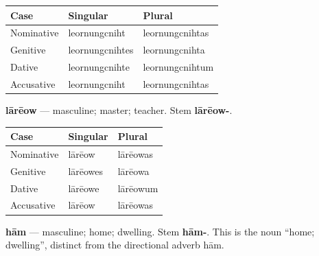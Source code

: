 \par\begingroup
\fontsize{10.5}{13.2}\selectfont
\setlength{\LTleft}{0pt}\setlength{\LTright}{\fill}
\noindent
\begin{tabular}{@{}>{\raggedright\arraybackslash}p{29.59mm}>{\raggedright\arraybackslash}p{44.39mm}>{\raggedright\arraybackslash}p{44.39mm}@{}}
\toprule
\textbf{Case} & \textbf{Singular} & \textbf{Plural} \\
\midrule
Nominative & leornungcniht & leornungcnihtas \\
Genitive & leornungcnihtes & leornungcnihta \\
Dative & leornungcnihte & leornungcnihtum \\
Accusative & leornungcniht & leornungcnihtas \\
\bottomrule
\end{tabular}
\par\endgroup

\textbf{lārēow} — masculine; master; teacher. Stem \textbf{lārēow-}.

\par\begingroup
\fontsize{10.5}{13.2}\selectfont
\setlength{\LTleft}{0pt}\setlength{\LTright}{\fill}
\noindent
\begin{tabular}{@{}>{\raggedright\arraybackslash}p{39.46mm}>{\raggedright\arraybackslash}p{39.46mm}>{\raggedright\arraybackslash}p{39.46mm}@{}}
\toprule
\textbf{Case} & \textbf{Singular} & \textbf{Plural} \\
\midrule
Nominative & lārēow & lārēowas \\
Genitive & lārēowes & lārēowa \\
Dative & lārēowe & lārēowum \\
Accusative & lārēow & lārēowas \\
\bottomrule
\end{tabular}
\par\endgroup

\textbf{hām} — masculine; home; dwelling. Stem \textbf{hām-}. This is the noun “home; dwelling”, distinct from the directional adverb hām.

